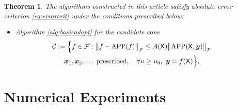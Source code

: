 \documentclass[]{mcom-l}
\theoremstyle{theorem}
\newtheorem{theorem}{Theorem}
\theoremstyle{remark}
\DeclareMathOperator{\APP}{APP}
\newcommand{\mX}{\mathsf{X}}
\newcommand{\bx}{{\boldsymbol{x}}}
\newcommand{\by}{{\boldsymbol{y}}}
\newcommand{\calc}{{\mathcal{C}}}
\newcommand{\calf}{{\mathcal{F}}}
\newcommand{\bignorm}[2][{}]{\ensuremath{\bigl \lVert #2 \bigr \rVert}_{#1}}
\begin{document}
\begin{theorem}
	The algorithms constructed in this article satisfy absolute error criterion \eqref{eq:errorcrit} under the conditions prescribed below:
	\begin{itemize}
		\item Algorithm \ref{alg:basicadapt} for the candidate cone
		\begin{multline}
		\label{eq:finalconeOne}
		\calc := 
		\Bigl \{f \in \calf : \bignorm[\calf]{f - \APP(f)} \le A(\mX) \bignorm[\calf]{\APP(\mX,\by)} \\
		\bx_1, \bx_2, \ldots \text{ prescribed}, \quad \forall n \ge n_0,  \ \by = f(\mX) \Bigr \},
		\end{multline}
	\end{itemize}
\end{theorem}
\section{Numerical Experiments}




\end{document}
